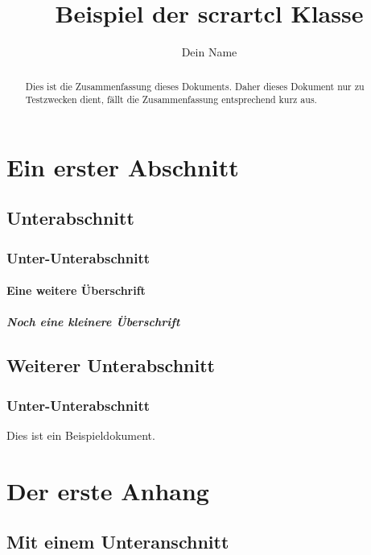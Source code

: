\documentclass[pdftex,a4paper]{scrartcl}
\title{Beispiel der scrartcl Klasse}
\author{Dein Name}
\begin{document}
\maketitle

\begin{abstract}
Dies ist die Zusammenfassung dieses Dokuments. Daher dieses Dokument nur zu Testzwecken dient, fällt die Zusammenfassung entsprechend kurz aus.
\end{abstract}

\tableofcontents

\section{Ein erster Abschnitt}

\subsection{Unterabschnitt}

\subsubsection{Unter-Unterabschnitt}

\paragraph{Eine weitere Überschrift}

\subparagraph{Noch eine kleinere Überschrift}

\subsection{Weiterer Unterabschnitt}

\subsubsection{Unter-Unterabschnitt}

Dies ist ein Beispieldokument.

\appendix

\section{Der erste Anhang}

\subsection{Mit einem Unteranschnitt}
\end{document}

